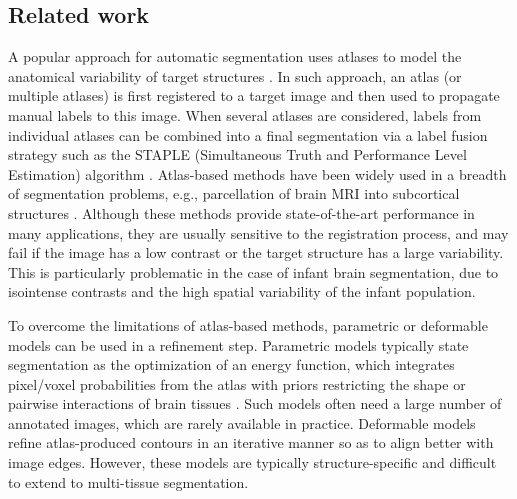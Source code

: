 \documentclass[twoside,espcrc2]{elsarticle}
\begin{document}
\subsection{Related work}
\label{ssec:relatedWork}

A popular approach for automatic segmentation uses atlases to model the anatomical variability of target structures \cite{prastawa2005automatic,weisenfeld2006segmentation,song2007clinical,weisenfeld2009automatic,shi2010neonatal,shi2010construction,shi2011infant,melbourne2012neobrains12,cardoso2013adapt,wang2014segmentation}. In such approach, an atlas (or multiple atlases) is first registered to a target image and then used to propagate manual labels to this image. When several atlases are considered, labels from individual atlases can be combined into a final segmentation via a label fusion strategy \cite{weisenfeld2006segmentation,weisenfeld2009automatic,wang2012atlas} such as the STAPLE (Simultaneous Truth and Performance Level Estimation) algorithm \cite{warfield2004simultaneous}. Atlas-based methods have been widely used in a breadth of segmentation problems, e.g.,
parcellation of brain MRI into subcortical structures \cite{dolz2015segmentation}. Although these methods provide state-of-the-art performance in many applications, they are usually sensitive to the registration process, and may fail if the image has a low contrast or the target structure has a large variability. This is particularly problematic in the case of infant brain segmentation, due to isointense contrasts and the high spatial variability of the infant population. 

To overcome the limitations of atlas-based methods, parametric \cite{prastawa2005automatic,xue2007automatic,ledig2012neonatal,wu2012automatic,cardoso2013adapt} or deformable \cite{wang2011automatic} models can be used in a refinement step. Parametric models typically state segmentation as the optimization of an energy function, which integrates pixel/voxel probabilities from the atlas with priors restricting the shape or pairwise interactions of brain tissues \cite{xue2007automatic,ledig2012neonatal,melbourne2012neobrains12,cardoso2013adapt}. Such models often need a large number of annotated images, which are rarely available in practice. Deformable models refine atlas-produced contours in an iterative manner so as to align better with image edges. However, these models are typically structure-specific and difficult to extend to multi-tissue segmentation. 
\end{document}
